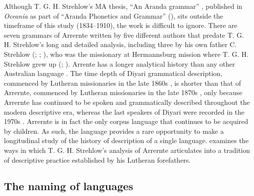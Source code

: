 Although T. G. H. Strehlow’s MA thesis, “An Aranda grammar” \citep{strehlow_aranda_1938}, published in \textit{Oceania} as part of “Aranda Phonetics and Grammar” (\citeyear{strehlow_aranda_1944}), sits outside the timeframe of this study (1834--1910), the work is difficult to ignore. There are seven grammars of Arrernte written by five different authors that predate T. G. H. Strehlow’s long and detailed analysis, including three by his own father C. Strehlow (\citeyear{strehlow_grammatik_1931}; \citeyear{strehlow_einige_1908}; \citeyear{strehlow_notitle_1910}), who was the missionary at Hermannsburg mission where T. G. H. Strehlow grew up (\citealt{hill_broken_2002}; \citealt{strehlow_tale_2011}). Arrente has a longer analytical history than any other Australian language \citep[159]{green_altyerre_2012}. The time depth of Diyari grammatical description, commenced by Lutheran missionaries in the late 1860s \citep{koch_untitled_1868}, is shorter than that of Arrernte, commenced by Lutheran missionaries in the late 1870s \citep{kempe_grammar_1891}, only because Arrernte has continued to be spoken and grammatically described throughout the modern descriptive era, whereas the last speakers of Diyari were recorded in the 1970s \citep{austin_grammar_1978}. Arrernte is in fact the only corpus language that continues to be acquired by children. As such, the language provides a rare opportunity to make a longitudinal study of the history of description of a single language. \citet{Stockigt2017,Stockigtinpress} examines the ways in which T. G. H. Strehlow’s analysis of Arrernte articulates into a tradition of descriptive practice established by his Lutheran forefathers.

\subsection{The naming of languages}
\label{sec:key:1.1.1}

